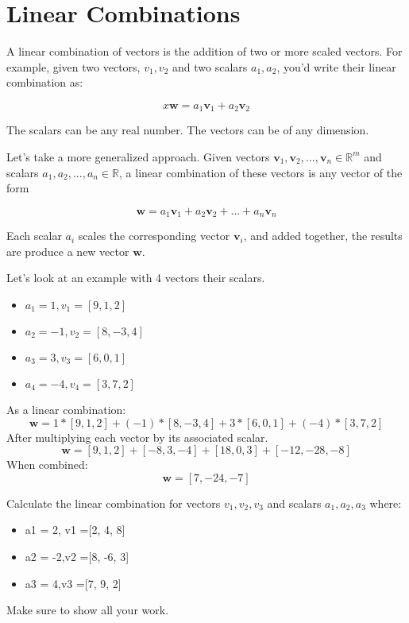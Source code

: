 \chapter{Linear Combinations}

A linear combination of vectors is the addition of two or more scaled vectors. For example, given two vectors, ${v}_1, {v}_2$ and two scalars $a_1,a_2$, you'd write their linear combination as:

\[x
\mathbf{w} = a_1\mathbf{v}_1 + a_2\mathbf{v}_2
\]

The scalars can be any real number. The vectors can be of any dimension. 

Let's take a more generalized approach. Given vectors $\mathbf{v}_1,
\mathbf{v}_2, ..., \mathbf{v}_n \in \mathbb{R}^m$ and scalars $a_1,
a_2, ..., a_n \in \mathbb{R}$, a linear combination of these vectors
is any vector of the form

\[
\mathbf{w} = a_1\mathbf{v}_1 + a_2\mathbf{v}_2 + ... + a_n\mathbf{v}_n
\]

Each scalar $a_i$ scales the corresponding vector $\mathbf{v}_i$, and
added together, the results are produce a new vector $\mathbf{w}$.

Let's look at an example with 4 vectors their scalars. 
\begin{itemize}
\item $a_1 = 1, v_1 = [9, 1, 2]$
\item $a_2 = -1, v_2 = [8, -3, 4]$
\item $a_3 = 3, v_3 = [6, 0, 1]$
\item $a_4 = -4, v_4 = [3, 7, 2]$
\end{itemize}
As a linear combination:
\[
\mathbf{w} = 1*[9,1,2] + (-1)*[8, -3, 4]+ 3*[6,0,1] + (-4)*[3,7,2]
\]
After multiplying each vector by its associated scalar.
 \[
\mathbf{w} = [9, 1, 2] + [-8, 3, -4] + [18, 0, 3] + [-12, -28, -8]
\]
When combined:
\[
\mathbf{w} = [7, -24, -7]
\]

\begin{Exercise}[title={Linear Combination}, label=linearCombo]
Calculate the linear combination 
for vectors $v_1, v_2, v_3$ and
scalars $a_1, a_2,a_3$ where:   
	\begin{itemize}
      \item a1 = 2, v1 =[2, 4, 8]
      \item a2 = -2,v2 =[8, -6, 3]
      \item a3 = 4,v3 =[7, 9, 2]
	\end{itemize}
Make sure to show all your work. 
\end{Exercise}

